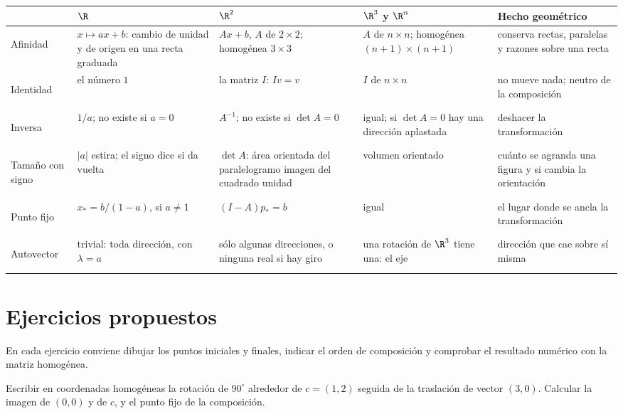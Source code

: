 {\small
\begin{tabularx}{\textwidth}{>{\bfseries\raggedright\arraybackslash}p{17mm}>{\raggedright\arraybackslash}p{30mm}>{\raggedright\arraybackslash}p{33mm}>{\raggedright\arraybackslash}p{30mm}Y}
\toprule
& \(\R\) & \(\R^2\) & \(\R^3\) y \(\R^n\) & Hecho geométrico\\
\midrule
Afinidad & \(x\mapsto ax+b\): cambio de unidad y de origen en una recta graduada &
\(Ax+b\), \(A\) de \(2\times2\); homogénea \(3\times3\) & \(A\) de \(n\times n\); homogénea
\((n+1)\times(n+1)\) & conserva rectas, paralelas y razones sobre una recta\\
\addlinespace
Identidad & el número \(1\) & la matriz \(I\): \(Iv=v\) & \(I\) de \(n\times n\) & no mueve
nada; neutro de la composición\\
\addlinespace
Inversa & \(1/a\); no existe si \(a=0\) & \(A^{-1}\); no existe si \(\det A=0\) & igual; si
\(\det A=0\) hay una dirección aplastada & deshacer la transformación\\
\addlinespace
Tamaño con signo & \(|a|\) estira; el signo dice si da vuelta & \(\det A\): área orientada
del paralelogramo imagen del cuadrado unidad & volumen orientado & cuánto se agranda una
figura y si cambia la orientación\\
\addlinespace
Punto fijo & \(x_\ast=b/(1-a)\), si \(a\neq1\) & \((I-A)p_\ast=b\) & igual & el lugar donde se
ancla la transformación\\
\addlinespace
Autovector & trivial: toda dirección, con \(\lambda=a\) & sólo algunas direcciones, o
ninguna real si hay giro & una rotación de \(\R^3\) tiene una: el eje & dirección que cae
sobre sí misma\\
\bottomrule
\end{tabularx}
}

\section{Ejercicios propuestos}

En cada ejercicio conviene dibujar los puntos iniciales y finales, indicar el orden de
composición y comprobar el resultado numérico con la matriz homogénea.

\begin{ejercicio}
Escribir en coordenadas homogéneas la rotación de \(90^\circ\) alrededor de \(c=(1,2)\)
seguida de la traslación de vector \((3,0)\). Calcular la imagen de \((0,0)\) y de \(c\), y el
punto fijo de la composición.
\end{ejercicio}

